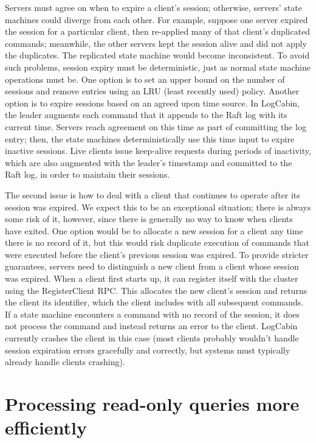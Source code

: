 Servers must agree on when to expire a client's session; otherwise,
servers' state machines could diverge from each other. For example,
suppose one server expired the session for a particular client, then
re-applied many of that client's duplicated commands; meanwhile, the
other servers kept the session alive and did not apply the duplicates.
The replicated state machine would become inconsistent. To avoid such
problems,
session expiry must be deterministic, just as normal state machine
operations must be. One option is to set an upper bound on the number
of sessions and remove entries using an LRU (least recently used)
policy. Another option is to expire sessions based on an agreed upon
time source. In LogCabin, the leader augments each command that it
appends to the Raft log with its current time. Servers reach
agreement on this time as part of committing the log entry; then, the
state machines deterministically use this time input to expire inactive
sessions. Live clients issue keep-alive requests during
periods of inactivity,
which are also augmented with the leader's timestamp and committed to
the Raft log, in order to maintain their sessions.

The second issue is how to deal with a client that continues to operate
after its session was expired. We expect this to be an exceptional
situation; there is always some risk of it, however, since there is
generally no way to know when clients have exited. One option would be
to allocate a new session for a client any time there is no record of
it, but this would risk duplicate execution of commands that were
executed before the client's previous session was expired.
To provide stricter guarantees,
servers need to distinguish a new client from a client whose session was
expired. When a client first starts up, it can register itself with
the cluster using the RegisterClient RPC. This
allocates the new client's session and returns the client its
identifier, which the client includes with all subsequent commands. If a
state machine encounters a command with no record of the session, it
does not process the command and instead returns an error to the client.
LogCabin currently crashes the client in this case (most clients
probably wouldn't handle session expiration errors gracefully and
correctly, but systems must typically already handle clients crashing).

\section{Processing read-only queries more efficiently}
\label{clients:readonly}

